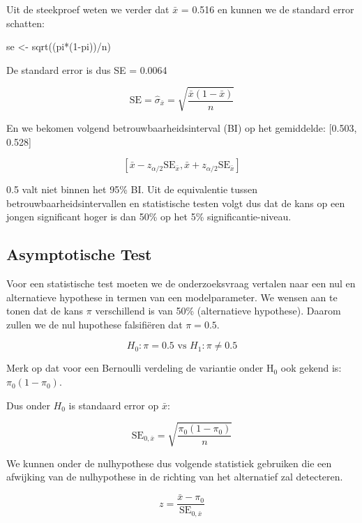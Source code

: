\documentclass[
  dutch,
  letterpaper,
  12pt]{book}
\newenvironment{Shaded}{\begin{snugshade}}{\end{snugshade}}
\newcommand{\DecValTok}[1]{\textcolor[rgb]{0.68,0.00,0.00}{#1}}
\newcommand{\FunctionTok}[1]{\textcolor[rgb]{0.28,0.35,0.67}{#1}}
\newcommand{\NormalTok}[1]{\textcolor[rgb]{0.00,0.23,0.31}{#1}}
\newcommand{\OtherTok}[1]{\textcolor[rgb]{0.00,0.23,0.31}{#1}}
\newcommand{\SpecialCharTok}[1]{\textcolor[rgb]{0.37,0.37,0.37}{#1}}
\theoremstyle{definition}
\theoremstyle{definition}
\theoremstyle{definition}
\theoremstyle{remark}
\begin{document}
Uit de steekproef weten we verder dat \(\bar x\) = 0.516 en kunnen we de
standard error schatten:

\begin{Shaded}
\begin{Highlighting}[]
\NormalTok{se }\OtherTok{\textless{}{-}} \FunctionTok{sqrt}\NormalTok{((pi}\SpecialCharTok{*}\NormalTok{(}\DecValTok{1}\SpecialCharTok{{-}}\NormalTok{pi))}\SpecialCharTok{/}\NormalTok{n)}
\end{Highlighting}
\end{Shaded}

De standard error is dus SE = 0.0064

\[\text{SE} = \hat\sigma_{\bar x} = \sqrt{\frac{\bar x(1-\bar x)}{n}}\]

En we bekomen volgend betrouwbaarheidsinterval (BI) op het gemiddelde:
{[}0.503, 0.528{]}

\[[\bar x - z_{\alpha/2} \text{SE}_{\bar x}, \bar x + z_{\alpha/2} \text{SE}_{\bar x}]\]

0.5 valt niet binnen het 95\% BI. Uit de equivalentie tussen
betrouwbaarheidsintervallen en statistische testen volgt dus dat de kans
op een jongen significant hoger is dan 50\% op het 5\%
significantie-niveau.

\subsection{Asymptotische Test}\label{asymptotische-test}

Voor een statistische test moeten we de onderzoeksvraag vertalen naar
een nul en alternatieve hypothese in termen van een modelparameter. We
wensen aan te tonen dat de kans \(\pi\) verschillend is van 50\%
(alternatieve hypothese). Daarom zullen we de nul hupothese falsifiëren
dat \(\pi = 0.5\).

\[H_0: \pi = 0.5 \text{ vs } H_1: \pi \neq 0.5\]

Merk op dat voor een Bernoulli verdeling de variantie onder H\(_0\) ook
gekend is: \(\pi_0 (1-\pi_0)\).

Dus onder \(H_0\) is standaard error op \(\bar x\):

\[\text{SE}_{0, \bar x}=\sqrt{\frac{\pi_0 (1-\pi_0)}{n}}\]

We kunnen onder de nulhypothese dus volgende statistiek gebruiken die
een afwijking van de nulhypothese in de richting van het alternatief zal
detecteren.

\[z = \frac{\bar x - \pi_0}{\text{SE}_{0, \bar x}}\]
\end{document}
